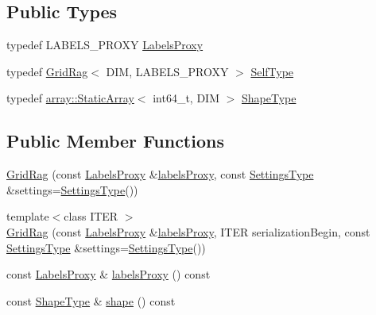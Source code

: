 \subsection*{Public Types}
\begin{DoxyCompactItemize}
\item 
typedef L\+A\+B\+E\+L\+S\+\_\+\+P\+R\+O\+X\+Y \hyperlink{classnifty_1_1graph_1_1GridRag_ad3146f72301da4f45b51e3b692776cf1}{Labels\+Proxy}
\item 
typedef \hyperlink{classnifty_1_1graph_1_1GridRag}{Grid\+Rag}$<$ D\+I\+M, L\+A\+B\+E\+L\+S\+\_\+\+P\+R\+O\+X\+Y $>$ \hyperlink{classnifty_1_1graph_1_1GridRag_aa5e47cff6ae70d13254abc3382b3b166}{Self\+Type}
\item 
typedef \hyperlink{namespacenifty_1_1array_a683f151f19c851754e0c6d55ed16a0c2}{array\+::\+Static\+Array}$<$ int64\+\_\+t, D\+I\+M $>$ \hyperlink{classnifty_1_1graph_1_1GridRag_a3693e007e1419dec9751cca751a1061d}{Shape\+Type}
\end{DoxyCompactItemize}
\subsection*{Public Member Functions}
\begin{DoxyCompactItemize}
\item 
\hyperlink{classnifty_1_1graph_1_1GridRag_a68da171354688c46cbb33d953e7ba267}{Grid\+Rag} (const \hyperlink{classnifty_1_1graph_1_1GridRag_ad3146f72301da4f45b51e3b692776cf1}{Labels\+Proxy} \&\hyperlink{classnifty_1_1graph_1_1GridRag_a9a9b20451bd5ea8ce3ee11af4018c995}{labels\+Proxy}, const \hyperlink{structnifty_1_1graph_1_1GridRag_1_1SettingsType}{Settings\+Type} \&settings=\hyperlink{structnifty_1_1graph_1_1GridRag_1_1SettingsType}{Settings\+Type}())
\item 
{\footnotesize template$<$class I\+T\+E\+R $>$ }\\\hyperlink{classnifty_1_1graph_1_1GridRag_adcc1771b68011ee041bdf83180f72e73}{Grid\+Rag} (const \hyperlink{classnifty_1_1graph_1_1GridRag_ad3146f72301da4f45b51e3b692776cf1}{Labels\+Proxy} \&\hyperlink{classnifty_1_1graph_1_1GridRag_a9a9b20451bd5ea8ce3ee11af4018c995}{labels\+Proxy}, I\+T\+E\+R serialization\+Begin, const \hyperlink{structnifty_1_1graph_1_1GridRag_1_1SettingsType}{Settings\+Type} \&settings=\hyperlink{structnifty_1_1graph_1_1GridRag_1_1SettingsType}{Settings\+Type}())
\item 
const \hyperlink{classnifty_1_1graph_1_1GridRag_ad3146f72301da4f45b51e3b692776cf1}{Labels\+Proxy} \& \hyperlink{classnifty_1_1graph_1_1GridRag_a9a9b20451bd5ea8ce3ee11af4018c995}{labels\+Proxy} () const 
\item 
const \hyperlink{classnifty_1_1graph_1_1GridRag_a3693e007e1419dec9751cca751a1061d}{Shape\+Type} \& \hyperlink{classnifty_1_1graph_1_1GridRag_adfc9dfed7d49642925311229e47a5cd2}{shape} () const 
\end{DoxyCompactItemize}
